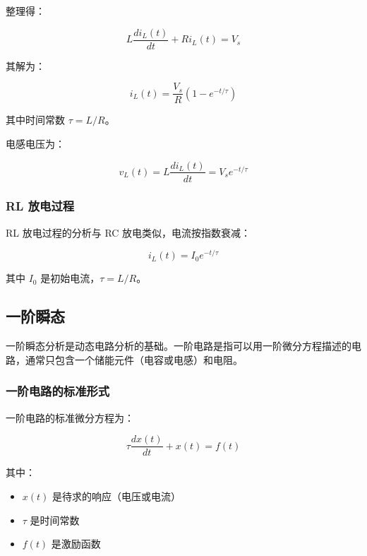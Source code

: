 整理得：

\begin{equation}
L \frac{di_L(t)}{dt} + R i_L(t) = V_s \label{eq:rl-charging-de}
\end{equation}

其解为：

\begin{equation}
i_L(t) = \frac{V_s}{R} (1 - e^{-t/\tau}) \label{eq:rl-charging-solution}
\end{equation}

其中时间常数 $\tau = L/R$。

电感电压为：

\begin{equation}
v_L(t) = L \frac{di_L(t)}{dt} = V_s e^{-t/\tau} \label{eq:rl-charging-voltage}
\end{equation}

\subsubsection{RL 放电过程}

RL 放电过程的分析与 RC 放电类似，电流按指数衰减：

\begin{equation}
i_L(t) = I_0 e^{-t/\tau} \label{eq:rl-discharging-solution}
\end{equation}

其中 $I_0$ 是初始电流，$\tau = L/R$。

\subsection{一阶瞬态}

一阶瞬态分析是动态电路分析的基础。一阶电路是指可以用一阶微分方程描述的电路，通常只包含一个储能元件（电容或电感）和电阻。

\subsubsection{一阶电路的标准形式}

一阶电路的标准微分方程为：

\begin{equation}
\tau \frac{dx(t)}{dt} + x(t) = f(t) \label{eq:first-order-standard}
\end{equation}

其中：
\begin{itemize}
  \item $x(t)$ 是待求的响应（电压或电流）
  \item $\tau$ 是时间常数
  \item $f(t)$ 是激励函数
\end{itemize}

